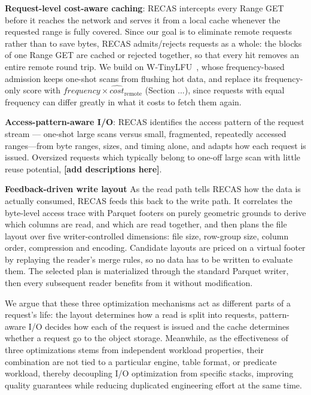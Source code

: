 \textbf{Request-level cost-aware caching}: 
RECAS intercepts every Range GET before it reaches the network and serves it from a local cache whenever the requested range is fully covered. Since our goal is to eliminate remote requests rather than to save bytes, RECAS admits/rejects requests as a whole: the blocks of one Range GET are cached or rejected together, so that every hit removes an entire remote round trip. We build on W-TinyLFU~\cite{tinylfu}, whose frequency-based admission keeps one-shot scans from flushing hot data, and replace its frequency-only score with $\mathit{frequency} \times \widehat{\mathit{cost}}_{\mathrm{remote}}$ (Section ...), since requests with equal frequency can differ greatly in what it costs to fetch them again.


\textbf{Access-pattern-aware I/O}:
RECAS identifies the access pattern of the request stream --- one-shot large scans versus small, fragmented, repeatedly accessed ranges---from byte ranges, sizes, and timing alone, and adapts how each request is issued. Oversized requests which typically belong to one-off large scan with little reuse potential, \textbf{[add descriptions here]}.

\textbf{Feedback-driven write layout}
As the read path tells RECAS how the
data is actually consumed, RECAS feeds this back to the write path. It correlates the byte-level access trace with Parquet footers on purely
geometric grounds to derive which columns are read, and which are read
together, and then plans the file layout over five writer-controlled
dimensions: file size, row-group size, column order, compression and encoding. Candidate layouts are priced on a virtual footer by replaying
the reader's merge rules, so no data has to be written to evaluate them. The
selected plan is materialized through the standard Parquet writer, then every
subsequent reader benefits from it without modification.

We argue that these three optimization mechanisms act as different parts of a request's life: the layout determines how a read is split into requests, pattern-aware I/O decides how each of the request is issued and the cache determines whether a request go to the object storage. Meanwhile, as the effectiveness of three optimizations stems from independent workload properties, their combination are not tied to a particular engine, table format, or predicate workload, thereby decoupling I/O optimization from specific stacks, improving quality guarantees while
reducing duplicated engineering effort at the same time.

